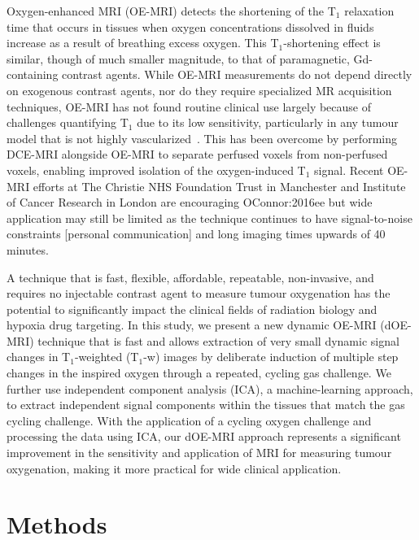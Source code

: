 Oxygen-enhanced MRI (OE-MRI) detects the shortening of the T$_1$ relaxation time that occurs in tissues when oxygen concentrations dissolved in fluids increase as a result of breathing excess oxygen.
This T$_1$-shortening effect is similar, though of much smaller magnitude, to that of paramagnetic, Gd-containing contrast agents.
While OE-MRI measurements do not depend directly on exogenous contrast agents, nor do they require specialized MR acquisition techniques, OE-MRI has not found routine clinical use largely because of challenges quantifying T$_1$ due to its low sensitivity, particularly in any tumour model that is not highly vascularized~\cite{OConnor:2016ee, Zhao:2015ez}.
This has been overcome by performing DCE-MRI alongside OE-MRI to separate perfused voxels from non-perfused voxels, enabling improved isolation of the oxygen-induced T$_1$ signal.
Recent OE-MRI efforts at The Christie NHS Foundation Trust in Manchester and Institute of Cancer Research in London are encouraging {OConnor:2016ee} but wide application may still be limited as the technique continues to have signal-to-noise constraints [personal communication] and long imaging times upwards of 40 minutes.

A technique that is fast, flexible, affordable, repeatable, non-invasive, and requires no injectable contrast agent to measure tumour oxygenation has the potential to significantly impact the clinical fields of radiation biology and hypoxia drug targeting.
In this study, we present a new dynamic OE-MRI (dOE-MRI) technique that is fast and allows extraction of very small dynamic signal changes in T$_1$-weighted (T$_1$-w) images by deliberate induction of multiple step changes in the inspired oxygen through a repeated, cycling gas challenge.
We further use independent component analysis (ICA), a machine-learning approach, to extract independent signal components within the tissues that match the gas cycling challenge.
With the application of a cycling oxygen challenge and processing the data using ICA, our dOE-MRI approach represents a significant improvement in the sensitivity and application of MRI for measuring tumour oxygenation, making it more practical for wide clinical application.


\section{Methods}
